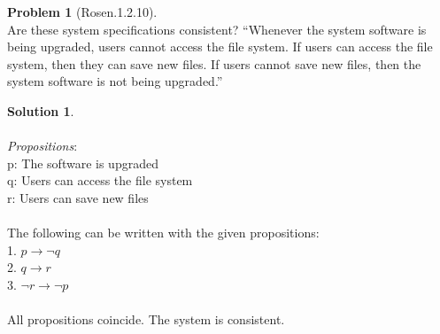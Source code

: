 \documentclass{article}
\theoremstyle{definition}
\newtheorem*{problem}{Problem}
\newtheorem*{solution}{Solution}
\begin{document}
\begin{problem}[Rosen.1.2.10]\ \\
Are these system specifications consistent? “Whenever
the system software is being upgraded, users cannot access
the file system. If users can access the file system,
then they can save new files. If users cannot save new
files, then the system software is not being upgraded.”
\begin{compactenum}
\renewcommand{\theenumi}{\alph{enumi}}

\end{compactenum}
\end{problem}

\begin{solution}\ \\
\ \\
\textit{Propositions}:\ \\
p: The software is upgraded\ \\
q: Users can access the file system\ \\
r: Users can save new files\ \\
\ \\
The following can be written with the given propositions:\ \\
1. $p \rightarrow \neg q$\ \\
2. $q \rightarrow r $\ \\
3. $\neg r \rightarrow \neg p$\ \\
\ \\
All propositions coincide. The system is consistent.
\begin{compactenum}
\renewcommand{\theenumi}{\alph{enumi}}

\end{compactenum}
\end{solution}
\end{document}
